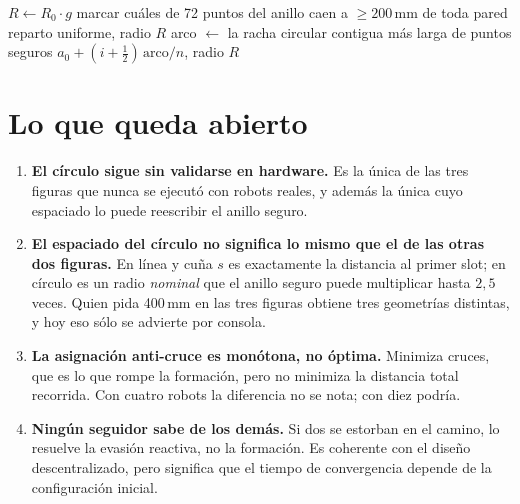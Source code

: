 \documentclass[11pt,a4paper]{article}
\theoremstyle{plain}
\begin{document}
\begin{algorithm}[H]
\caption{Anillo seguro (sólo para la figura en círculo)}
\label{alg:anillo}
\begin{algorithmic}[1]
    \State $R \gets R_0 \cdot g$
    \State marcar cuáles de 72 puntos del anillo caen a $\ge 200$\,mm de toda
           pared
      \State \Return reparto uniforme, radio $R$
    \EndIf
    \State arco $\gets$ la racha circular contigua más larga de puntos seguros
      \State \Return $a_0 + (i + \tfrac{1}{2})\,\text{arco}/n$, radio $R$
    \EndIf
  \EndFor
\EndProcedure
\end{algorithmic}
\end{algorithm}

\section{Lo que queda abierto}

\begin{enumerate}
  \item \textbf{El círculo sigue sin validarse en hardware.} Es la única de las
    tres figuras que nunca se ejecutó con robots reales, y además la única cuyo
    espaciado lo puede reescribir el anillo seguro.
  \item \textbf{El espaciado del círculo no significa lo mismo que el de las
    otras dos figuras.} En línea y cuña $s$ es exactamente la distancia al
    primer slot; en círculo es un radio \emph{nominal} que el anillo seguro
    puede multiplicar hasta $2{,}5$ veces. Quien pida 400\,mm en las tres
    figuras obtiene tres geometrías distintas, y hoy eso sólo se advierte por
    consola.
  \item \textbf{La asignación anti-cruce es monótona, no óptima.} Minimiza
    cruces, que es lo que rompe la formación, pero no minimiza la distancia
    total recorrida. Con cuatro robots la diferencia no se nota; con diez
    podría.
  \item \textbf{Ningún seguidor sabe de los demás.} Si dos se estorban en el
    camino, lo resuelve la evasión reactiva, no la formación. Es coherente con
    el diseño descentralizado, pero significa que el tiempo de convergencia
    depende de la configuración inicial.
\end{enumerate}
\end{document}
